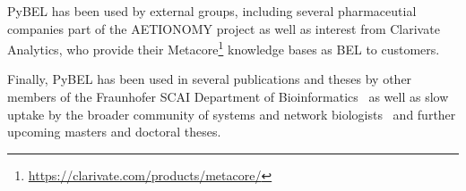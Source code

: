 PyBEL has been used by external groups, including several pharmaceutial companies part of the AETIONOMY project as well as interest from Clarivate Analytics, who provide their Metacore\footnote{\url{https://clarivate.com/products/metacore/}} knowledge bases as BEL to customers.

Finally, PyBEL has been used in several publications and theses by other members of the Fraunhofer SCAI Department of Bioinformatics~\cite{Domingo-Fernandez2018,Domingo-Fernandez2019a,Mubeen2019} as well as slow uptake by the broader community of systems and network biologists~\cite{Kwon2019,Gyori2017} and further upcoming masters and doctoral theses.

